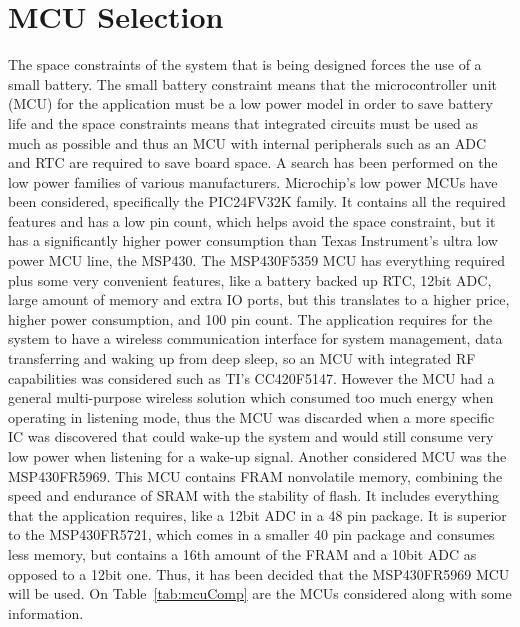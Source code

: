 \section{MCU Selection}
The space constraints of the system that is being designed forces the use of a small battery. The small battery constraint means that the microcontroller unit (MCU) for the application must be a low power model in order to save battery life and the space constraints means that integrated circuits must be used as much as possible and thus an MCU with internal peripherals such as an ADC and RTC are required to save board space. A search has been performed on the low power families of various manufacturers. Microchip’s low power MCUs have been considered, specifically the PIC24FV32K family. It contains all the required features and has a low pin count, which helps avoid the space constraint, but it has a significantly higher power consumption than Texas Instrument’s ultra low power MCU line, the MSP430. The MSP430F5359 MCU has everything required plus some very convenient features, like a battery backed up RTC, 12bit ADC, large amount of memory and extra IO ports, but this translates to a higher price, higher power consumption, and 100 pin count. The application requires for the system to have a wireless communication interface for system management, data transferring and waking up from deep sleep, so an MCU with integrated RF capabilities was considered such as TI’s CC420F5147. However the MCU had a general multi-purpose wireless solution which consumed too much energy when operating in listening mode, thus the MCU was discarded when a more specific IC was discovered that could wake-up the system and would still consume very low power when listening for a wake-up signal. Another considered MCU was the MSP430FR5969. This MCU contains FRAM nonvolatile memory, combining the speed and endurance of SRAM with the stability of flash. It includes everything that the application requires, like a 12bit ADC in a 48 pin package. It is superior to the MSP430FR5721, which comes in a smaller 40 pin package and consumes less memory, but contains a 16th amount of the FRAM and a 10bit ADC as opposed to a 12bit one. Thus, it has been decided that the MSP430FR5969 MCU will be used. On Table~\ref{tab:mcuComp} are the MCUs considered along with some information.
